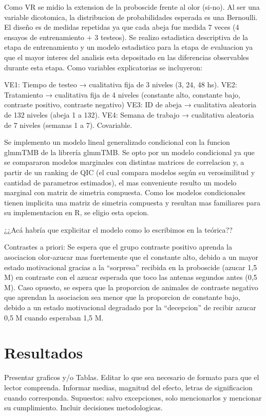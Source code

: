 \documentclass[
]{article}
\begin{document}
Como VR se midio la extension de la proboscide frente al olor (si-no).
Al ser una variable dicotomica, la distribucion de probabilidades
esperada es una Bernoulli. El diseño es de medidas repetidas ya que cada
abeja fue medida 7 veces (4 ensayos de entrenamiento + 3 testeos). Se
realizo estadistica descriptiva de la etapa de entrenamiento y un modelo
estadistico para la etapa de evaluacion ya que el mayor interes del
analisis esta depositado en las diferencias observables durante esta
etapa. Como variables explicatorias se incluyeron:

VE1: Tiempo de testeo → cualitativa fija de 3 niveles (3, 24, 48 hs).
VE2: Tratamiento → cualitativa fija de 4 niveles (constante alto,
constante bajo, contraste positivo, contraste negativo) VE3: ID de abeja
→ cualitativa aleatoria de 132 niveles (abeja 1 a 132). VE4: Semana de
trabajo → cualitativa aleatoria de 7 niveles (semanas 1 a 7).
Covariable.

Se implemento un modelo lineal generalizado condicional con la funcion
glmmTMB de la librería glmmTMB. Se opto por un modelo condicional ya que
se compararon modelos marginales con distintas matrices de correlacion
y, a partir de un ranking de QIC (el cual compara modelos según su
verosimilitud y cantidad de parametros estimados), el mas conveniente
resulto un modelo marginal con matriz de simetria compuesta. Como los
modelos condicionales tienen implicita una matriz de simetria compuesta
y resultan mas familiares para su implementacion en R, se eligio esta
opcion.

¿¿Acá habría que explicitar el modelo como lo escribimos en la teórica??

Contrastes a priori: Se espera que el grupo contraste positivo aprenda
la asociacion olor-azucar mas fuertemente que el constante alto, debido
a un mayor estado motivacional gracias a la ``sorpresa'' recibida en la
proboscide (azucar 1,5 M) en contraste con el azucar esperada que toco
las antenas segundos antes (0,5 M). Caso opuesto, se espera que la
proporcion de animales de contraste negativo que aprendan la asociacion
sea menor que la proporcion de constante bajo, debido a un estado
motivacional degradado por la ``decepcion'' de recibir azucar 0,5 M
cuando esperaban 1,5 M.

\hypertarget{resultados}{%
\section{Resultados}\label{resultados}}

Presentar graficos y/o Tablas. Editar lo que sea necesario de formato
para que el lector comprenda. Informar medias, magnitud del efecto,
letras de significacion cuando corresponda. Supuestos: salvo
excepciones, solo mencionarlos y mencionar su cumplimiento. Incluir
decisiones metodologicas.
\end{document}

